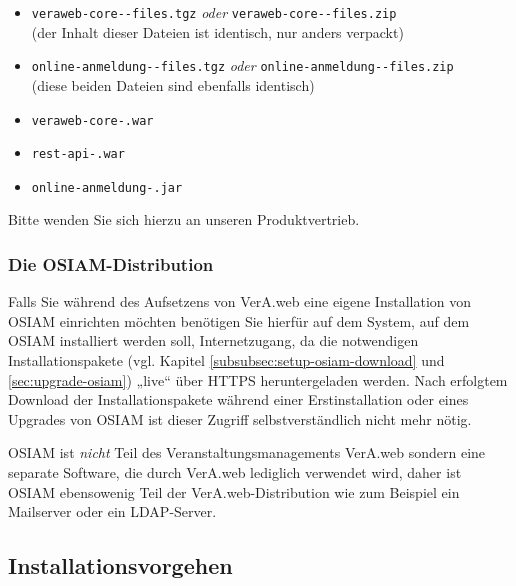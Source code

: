 \begin{itemize}
 \item{\texttt{veraweb-core-\vwiaverssw{}-files.tgz}
  \emph{oder} \texttt{veraweb-core-\vwiaverssw{}-files.zip}
  \\(der Inhalt dieser Dateien ist identisch, nur anders verpackt)}
\ifoa
 \item{\texttt{online-anmeldung-\vwiaverssw{}-files.tgz}
  \emph{oder} \texttt{online-anmeldung-\vwiaverssw{}-files.zip}
  \\(diese beiden Dateien sind ebenfalls identisch)}
\fi%
 \item{\texttt{veraweb-core-\vwiaverssw{}.war}}
 \item{\texttt{rest-api-\vwiaverssw{}.war}}
\ifoa
 \item{\texttt{online-anmeldung-\vwiaverssw{}.jar}}
\fi%
\end{itemize}

Bitte wenden Sie sich hierzu an unseren Produktvertrieb.

\ifoa

\subsubsection{Die OSIAM-Distribution}\label{subsubsec:intro-distro-ong}

Falls Sie während des Aufsetzens von VerA.web eine eigene Installation
von OSIAM einrichten möchten benötigen Sie hierfür auf dem System, auf
dem OSIAM installiert werden soll, Internetzugang, da die notwendigen
Installationspakete (vgl. Kapitel
\ifupgradeanleitung\else%
\ref{subsubsec:setup-osiam-download} und
\fi%
\ref{sec:upgrade-osiam}) „live“ über HTTPS heruntergeladen werden. Nach
erfolgtem Download der Installationspakete während einer Erstinstallation
oder eines Upgrades von OSIAM ist dieser Zugriff selbstverständlich nicht
mehr nötig.

OSIAM ist \emph{nicht} Teil des Veranstaltungsmanagements VerA.web sondern
eine separate Software, die durch VerA.web lediglich verwendet wird, daher
ist OSIAM ebensowenig Teil der VerA.web-Distribution wie zum Beispiel ein
Mailserver oder ein LDAP-Server.

\fi%

\subsection{Installationsvorgehen}\label{subsec:intro-install}

